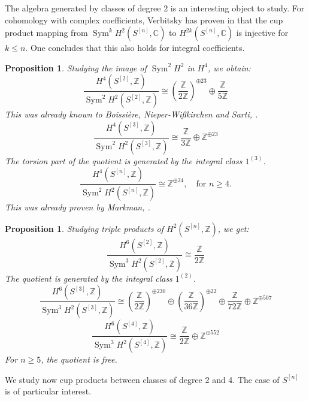 \documentclass{amsart}
\DeclareMathOperator{\Sym}{Sym}
\newcommand{\hilb}[1]{^{[#1]}}
\newcommand{\IC}{\mathbb{C}}
\newcommand{\IZ}{\mathbb{Z}}
\theoremstyle{plain}
\newtheorem{proposition}[theorem]{Proposition}
\theoremstyle{definition}
\theoremstyle{remark}
\begin{document}
The algebra generated by classes of degree 2 is an interesting object to study. For cohomology with complex coefficients, Verbitsky has proven in \cite{Verbitsky} that the cup product mapping from $\Sym^k H^2(S\hilb{n},\IC)$ to $H^{2k}(S\hilb{n},\IC)$ is injective for $k\leq n$. One concludes that this also holds for integral coefficients.
\begin{proposition} Studying the image of $\Sym^2H^2$ in $H^4$, we obtain: 
$$
\frac{H^4(S\hilb{2},\IZ)}{\Sym^2 H^2(S\hilb{2},\IZ)}  \cong \left(\frac{\IZ}{2\IZ}\right)^{\oplus 23} \oplus \frac{\IZ}{5\IZ}
$$
This was already known to Boissi\`{e}re, Nieper-Wi\ss kirchen and Sarti, \cite[Prop. 3]{BNS}.
$$
\frac{H^4(S\hilb{3},\IZ)}{\Sym^2 H^2(S\hilb{3},\IZ)} \cong \frac{\IZ}{3\IZ} \oplus \IZ^ {\oplus 23} 
$$
The torsion part of the quotient is generated by the integral class $1^{(3)}$.
$$
\frac{H^4(S\hilb{n},\IZ)}{\Sym^2 H^2(S\hilb{n},\IZ)} \cong  \IZ^ {\oplus 24}, \quad \text{for }n\geq 4.
$$
This was already proven by Markman, \cite[Thm. 1.10]{Markman2}.
\end{proposition}
\begin{proposition} Studying triple products of $H^2(S\hilb{n},\IZ)$, we get:
$$
\frac{H^6(S\hilb{2},\IZ)}{\Sym^3 H^2(S\hilb{2},\IZ)} \cong 
\frac{\IZ}{2\IZ}
$$
The quotient is generated by the integral class $1^{(2)}$.
$$
\frac{H^6(S\hilb{3},\IZ)}{\Sym^3 H^2(S\hilb{3},\IZ)} \cong  \left(\frac{\IZ}{2\IZ}\right)^{\oplus 230}\oplus \left(\frac{\IZ}{36\IZ}\right)^{\oplus 22}\oplus \frac{\IZ}{72\IZ} \oplus \IZ^{\oplus 507}
$$
$$
\frac{H^6(S\hilb{4},\IZ)}{\Sym^3 H^2(S\hilb{4},\IZ)} \cong  \frac{\IZ}{2\IZ} \oplus \IZ^{\oplus 552}
$$
For $n\geq 5$, the quotient is free.
\end{proposition}
We study now cup products between classes of degree 2 and 4. The case of $S\hilb{n}$ is of particular interest.
\end{document}

